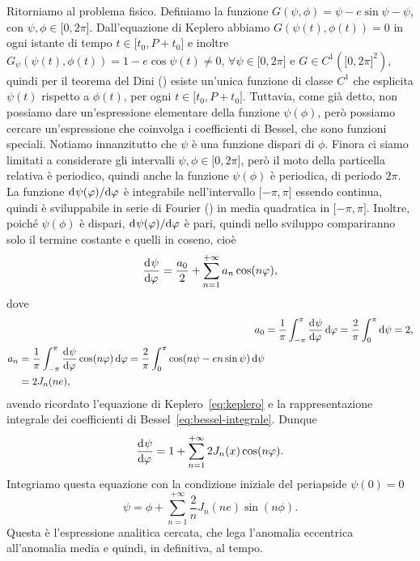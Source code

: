 Ritorniamo al problema fisico. Definiamo la funzione $G(\psi,\phi) = \psi -
e\sin\psi - \psi$, con $\psi,\phi\in\mathopen{[}0,
2\pi\mathclose{]}$. Dall'equazione di Keplero abbiamo $G(\psi(t),\phi(t)) = 0$
in ogni istante di tempo $t\in\mathopen{[}t_0,P+t_0\mathclose{]}$ e inoltre
$G_\psi(\psi(t),\phi(t)) = 1 - e\cos\psi(t) \neq 0$,
$\forall\psi\in\mathopen{[}0, 2\pi\mathclose{]}$ e $G\in C^1(\mathopen{[}0,
2\pi\mathclose{]}^2)$, quindi per il teorema del Dini
(\textcite{demarco:analisi2}) esiste un'unica funzione di classe $C^1$ che
esplicita $\psi(t)$ rispetto a $\phi(t)$, per ogni
$t\in\mathopen{[}t_0,P+t_0\mathclose{]}$. Tuttavia, come già detto, non possiamo
dare un'espressione elementare della funzione $\psi(\phi)$, però possiamo
cercare un'espressione che coinvolga i coefficienti di Bessel, che sono funzioni
speciali. Notiamo innanzitutto che $\psi$ è una funzione dispari di
$\phi$. Finora ci siamo limitati a considerare gli intervalli
$\psi,\phi\in\mathopen{[}0, 2\pi\mathclose{]}$, però il moto della particella
relativa è periodico, quindi anche la funzione $\psi(\phi)$ è periodica, di
periodo $2\pi$.  La funzione $\mathrm{d}^{}\psi(\varphi) / \mathrm{d} {\varphi}^{}$ è integrabile
nell'intervallo $\mathopen{[}-\pi, \pi\mathclose{]}$ essendo continua, quindi è
sviluppabile in serie di Fourier (\textcite{demarco:analisi2}) in media
quadratica in $\mathopen{[}-\pi, \pi\mathclose{]}$. Inoltre, poiché $\psi(\phi)$
è dispari, $\mathrm{d}^{}\psi(\varphi) / \mathrm{d} {\varphi}^{}$ è pari, quindi nello sviluppo
compariranno solo il termine costante e quelli in coseno, cioè
\begin{equation}
  \frac{{\mathop{}\!\mathrm{d}^{}}\psi}{\mathop{}\!\mathrm{d} {\varphi}^{}} = \frac{a_0}{2} + \sum_{n=1}^{+\infty}a_n\cos(n\varphi),
\end{equation}
dove
\begin{align}
  a_0 &= \frac{1}{\pi}\int_{-\pi}^{\pi}\toder{\psi}{\phi}\dd\phi =
  \frac{2}{\pi}\int_0^\pi\dd\psi = 2,\\
  \begin{split}
    a_n &= \frac{1}{\pi}\int_{-\pi}^\pi\toder{\psi}{\phi}\cos(n\phi)\dd\phi =
    \frac{2}{\pi}\int_0^\pi\cos(n\psi - en\sin\psi)\dd\psi \\
    &= 2J_n(ne),
  \end{split}
\end{align}
avendo ricordato l'equazione di Keplero~\eqref{eq:keplero} e la rappresentazione
integrale dei coefficienti di Bessel~\eqref{eq:bessel-integrale}. Dunque
\begin{equation}
  \frac{{\mathop{}\!\mathrm{d}^{}}\psi}{\mathop{}\!\mathrm{d} {\varphi}^{}} = 1 + \sum_{n=1}^{+\infty}2J_n(x)\cos(n\varphi).
\end{equation}
Integriamo questa equazione con la condizione iniziale del periapside $\psi(0) =
0$
\begin{equation}
  \psi = \phi + \sum_{n=1}^{+\infty}\frac{2}{n}J_n(ne)\sin(n\phi).
\end{equation}
Questa è l'espressione analitica cercata, che lega l'anomalia eccentrica
all'anomalia media e quindi, in definitiva, al tempo.


